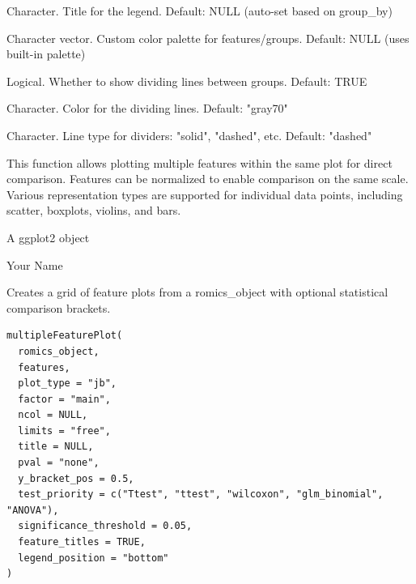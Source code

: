 \documentclass[a4paper]{book}
\begin{document}
\begin{Arguments}
\begin{ldescription}
\item[\code{legend\_title}] Character. Title for the legend. Default: NULL (auto-set based on group\_by)

\item[\code{palette}] Character vector. Custom color palette for features/groups. Default: NULL (uses built-in palette)

\item[\code{show\_dividers}] Logical. Whether to show dividing lines between groups. Default: TRUE

\item[\code{divider\_color}] Character. Color for the dividing lines. Default: "gray70"

\item[\code{divider\_linetype}] Character. Line type for dividers: "solid", "dashed", etc. Default: "dashed"
\end{ldescription}
\end{Arguments}
%
\begin{Details}
This function allows plotting multiple features within the same plot for direct comparison.
Features can be normalized to enable comparison on the same scale. Various representation types are
supported for individual data points, including scatter, boxplots, violins, and bars.
\end{Details}
%
\begin{Value}
A ggplot2 object
\end{Value}
%
\begin{Author}
Your Name
\end{Author}
%
\begin{Description}
Creates a grid of feature plots from a romics\_object with optional statistical comparison brackets.
\end{Description}
%
\begin{Usage}
\begin{verbatim}
multipleFeaturePlot(
  romics_object,
  features,
  plot_type = "jb",
  factor = "main",
  ncol = NULL,
  limits = "free",
  title = NULL,
  pval = "none",
  y_bracket_pos = 0.5,
  test_priority = c("Ttest", "ttest", "wilcoxon", "glm_binomial", "ANOVA"),
  significance_threshold = 0.05,
  feature_titles = TRUE,
  legend_position = "bottom"
)
\end{verbatim}
\end{Usage}
%
\end{document}
